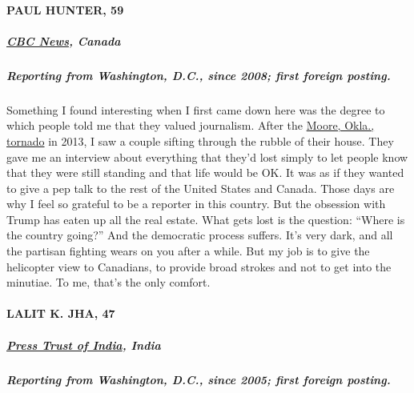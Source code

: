 \hypertarget{paul-hunter-59}{%
\paragraph{PAUL HUNTER, 59}\label{paul-hunter-59}}

\hypertarget{cbc-news-canada}{%
\subparagraph{\texorpdfstring{\textbf{\href{https://www.cbc.ca/news/world/paul-hunter-1.2449165}{CBC
News}, Canada}}{CBC News, Canada}}\label{cbc-news-canada}}

\hypertarget{reporting-from-washington-dc-since-2008-first-foreign-posting}{%
\subparagraph{\texorpdfstring{\textbf{Reporting from Washington, D.C.,
since 2008; first foreign
posting.}}{Reporting from Washington, D.C., since 2008; first foreign posting.}}\label{reporting-from-washington-dc-since-2008-first-foreign-posting}}

Something I found interesting when I first came down here was the degree
to which people told me that they valued journalism. After the
\href{https://www.nytimes.com/2013/05/21/us/tornado-oklahoma.html}{Moore,
Okla., tornado} in 2013, I saw a couple sifting through the rubble of
their house. They gave me an interview about everything that they'd lost
simply to let people know that they were still standing and that life
would be OK. It was as if they wanted to give a pep talk to the rest of
the United States and Canada. Those days are why I feel so grateful to
be a reporter in this country. But the obsession with Trump has eaten up
all the real estate. What gets lost is the question: ``Where is the
country going?'' And the democratic process suffers. It's very dark, and
all the partisan fighting wears on you after a while. But my job is to
give the helicopter view to Canadians, to provide broad strokes and not
to get into the minutiae. To me, that's the only comfort.

\hypertarget{lalit-k-jha-47}{%
\paragraph{LALIT K. JHA, 47}\label{lalit-k-jha-47}}

\hypertarget{press-trust-of-india-india}{%
\subparagraph{\texorpdfstring{\textbf{\href{http://www.ptinews.com/}{Press
Trust of India},
India}}{Press Trust of India, India}}\label{press-trust-of-india-india}}

\hypertarget{reporting-from-washington-dc-since-2005-first-foreign-posting}{%
\subparagraph{\texorpdfstring{\textbf{Reporting from Washington, D.C.,
since 2005; first foreign
posting.}}{Reporting from Washington, D.C., since 2005; first foreign posting.}}\label{reporting-from-washington-dc-since-2005-first-foreign-posting}}

